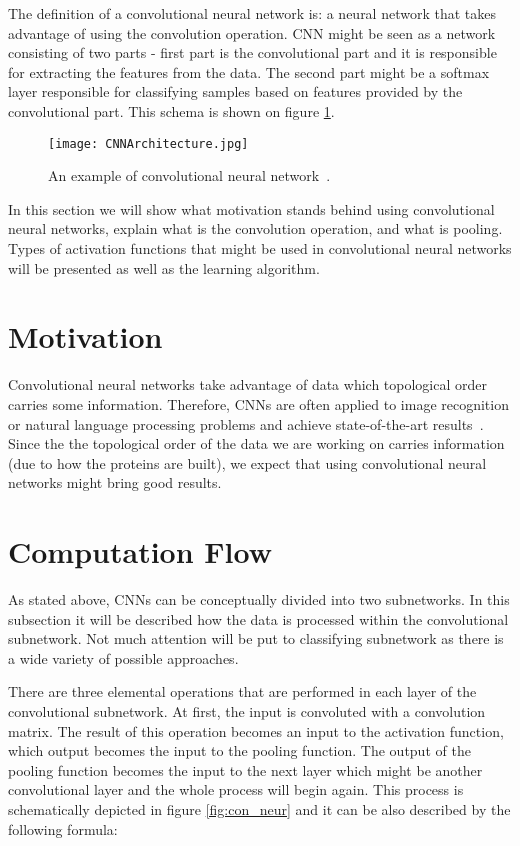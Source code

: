 \documentclass[a4paper,10pt]{report}
\begin{document}
      The definition of a convolutional neural network is: a neural network that takes advantage of using the convolution operation. CNN might be seen as a network consisting of two parts - first part is the convolutional part and it is responsible for extracting the features from the data. The second part might be a softmax layer responsible for classifying samples based on features provided by the convolutional part. This schema is shown on figure \ref{fig:con_network}. 
      
     \begin{figure}[h!]
	  \centering
	  \texttt{[image: CNNArchitecture.jpg]}
	  \caption{An example of convolutional neural network~\cite{CONV_NET}.}
	  \label{fig:con_network}
	\end{figure} 
      
      In this section we will show what motivation stands behind using convolutional neural networks, explain what is the convolution operation, and what is pooling. Types of activation functions that might be used in convolutional neural networks
      will be presented as well as the learning algorithm. 
      
      \section{Motivation}
	Convolutional neural networks take advantage of data which topological order carries some information. Therefore, CNNs are often applied to image recognition or natural language processing problems and achieve state-of-the-art results~\cite{ImageNet, CONV_NLP}. Since the the topological order of the data we are working on carries information (due to how the proteins are built), we expect that using convolutional neural networks might bring good results. 
	
      \section{Computation Flow}
	As stated above, CNNs can be conceptually divided into two subnetworks. In this subsection it will be described how the data is processed within the convolutional subnetwork. Not much attention will be put to classifying subnetwork as there is a wide variety of possible approaches. 
	
	There are three elemental operations that are performed in each layer of the convolutional subnetwork. At first, the input is convoluted with a convolution matrix. The result of this operation becomes an input to the activation function, which output becomes the input to the pooling function. The output of the pooling function becomes the input to the next layer which might be another convolutional layer and the whole process will begin again. This process is schematically depicted in figure \ref{fig:con_neur} and it can be also described by the following formula: 
	
\end{document}
